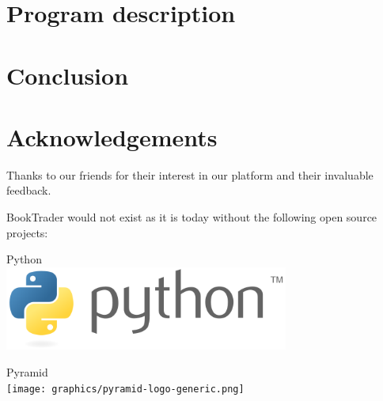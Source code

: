 \documentclass[11pt,a4paper]{article}
\begin{document}
\section{Program description}






\section{Conclusion}




\section{Acknowledgements}


Thanks to our friends for their interest in our platform and
their invaluable feedback.

\vspace{0.5cm}

BookTrader would not exist as it is today without the following
open source projects:

\vspace{0.2cm}


\hspace{0.025\linewidth}
\begin{minipage}[b]{0.45\linewidth}
  Python\\
  \includegraphics[width=0.7\textwidth]{graphics/python-logo-generic.png}
\end{minipage}
\hspace{0.05\linewidth}
\begin{minipage}[b]{0.45\linewidth}
  Pyramid\\
  \texttt{[image: graphics/pyramid-logo-generic.png]}
\end{minipage}
\end{document}
